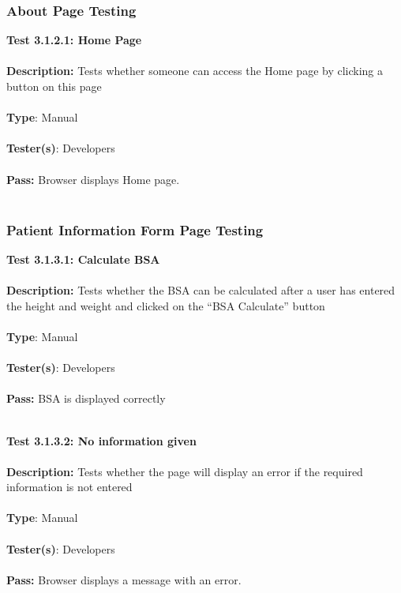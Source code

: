 \documentclass[12pt]{article}
\begin{document}
\subsubsection{About Page Testing}
\begin{tcolorbox}
\textbf{Test 3.1.2.1: Home Page} \\ \\
\textbf{Description:} Tests whether someone can access the Home page by clicking a button on this page\\ \\
\textbf{Type}: Manual \\ \\
\textbf{Tester(s)}:  Developers\\ \\
\textbf{Pass:}  Browser displays Home page.\\ \\
\end{tcolorbox}

\subsubsection{Patient Information Form Page Testing}
\begin{tcolorbox}
\textbf{Test 3.1.3.1: Calculate BSA} \\ \\
\textbf{Description:} Tests whether the BSA can be calculated after a user has entered the height and weight and clicked on the “BSA Calculate” button\\ \\
\textbf{Type}:  Manual\\ \\
\textbf{Tester(s)}:  Developers\\ \\
\textbf{Pass:}  BSA is displayed correctly\\ \\
\end{tcolorbox}

\begin{tcolorbox}
\textbf{Test 3.1.3.2: No information given} \\ \\
\textbf{Description:} Tests whether the page will display an error if the required information is not entered\\ \\
\textbf{Type}:  Manual\\ \\
\textbf{Tester(s)}:  Developers\\ \\
\textbf{Pass:}  Browser displays a message with an error. \\ \\
\end{tcolorbox}
\end{document}
